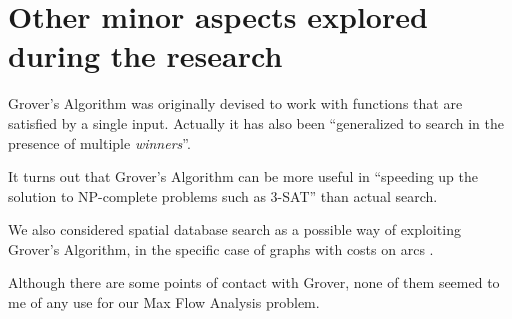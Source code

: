 
\chapter{Other minor aspects explored during the research}
\label{chp:other}

Grover's Algorithm was originally devised to work with functions that are satisfied by a single input. Actually it has also been ``generalized to search in the presence of multiple \textit{winners}''. \cite{Boyer1998}

\bigskip

It turns out that Grover's Algorithm can be more useful in ``speeding up the solution to NP-complete problems such as 3-SAT'' than actual search. \cite{montanaro2016quantum}

\bigskip

We also considered spatial database search as a possible way of exploiting Grover's Algorithm, in the specific case of graphs with costs on arcs \cite{Aharonov:2001:QWG:380752.380758, childs2004spatial}.

Although there are some points of contact with Grover, none of them seemed to me of any use for our Max Flow Analysis problem.